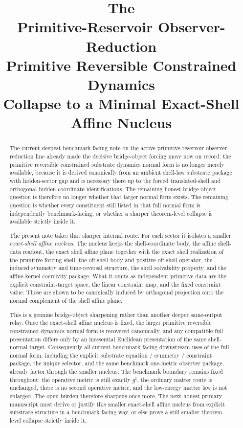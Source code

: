\documentclass[11pt]{article}
\title{\textbf{The \TheoryName{}}\\[0.4em]
\large Primitive-Reservoir Observer-Reduction\\
\large Primitive Reversible Constrained Dynamics\\
\large Collapse to a Minimal Exact-Shell Affine Nucleus}
\author{}
\date{}
\newcommand{\CompletedMetric}{g^{\sharp}}
\begin{document}
\maketitle

\begin{abstract}
The current deepest benchmark-facing note on the active primitive-reservoir observer-reduction line already made the decisive bridge-object forcing move now on record: the primitive reversible constrained substrate dynamics normal form is no longer merely available, because it is derived canonically from an ambient shell-law substrate package with hidden-sector gap and is necessary there up to the forced translated-shell and orthogonal-hidden coordinate identifications. The remaining honest bridge-object question is therefore no longer whether that larger normal form exists. The remaining question is whether every constituent still listed in that full normal form is independently benchmark-facing, or whether a sharper theorem-level collapse is available strictly inside it.

The present note takes that sharper internal route. For each sector it isolates a smaller \emph{exact-shell affine nucleus}. The nucleus keeps the shell-coordinate body, the affine shell-data readout, the exact shell affine plane together with the exact shell realization of the primitive forcing shell, the off-shell body and positive off-shell operator, the induced symmetry and time-reversal structure, the shell solvability property, and the affine-kernel coercivity package. What it omits as independent primitive data are the explicit constraint-target space, the linear constraint map, and the fixed constraint value. Those are shown to be canonically induced by orthogonal projection onto the normal complement of the shell affine plane.

This is a genuine bridge-object sharpening rather than another deeper same-output relay. Once the exact-shell affine nucleus is fixed, the larger primitive reversible constrained dynamics normal form is recovered canonically, and any compatible full presentation differs only by an inessential Euclidean presentation of the same shell-normal target. Consequently all current benchmark-facing downstream uses of the full normal form, including the explicit substrate equation / symmetry / constraint package, the unique selector, and the same benchmark one-metric observer package, already factor through the smaller nucleus. The benchmark boundary remains fixed throughout: the operative metric is still exactly \(\CompletedMetric\), the ordinary matter route is unchanged, there is no second operative metric, and the low-energy matter law is not enlarged. The open burden therefore sharpens once more. The next honest primary manuscript must derive or justify this smaller exact-shell affine nucleus from explicit substrate structure in a benchmark-facing way, or else prove a still smaller theorem-level collapse strictly inside it.
\end{abstract}
\end{document}
